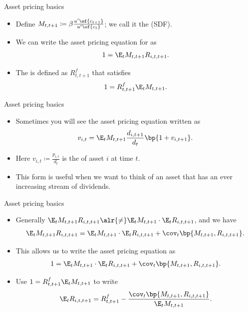 \documentclass[11pt,xcolor={dvipsnames},aspectratio=159,hyperref={pdftex,pdfpagemode=UseNone,hidelinks,pdfdisplaydoctitle=true},usepdftitle=false]{beamer}
\begin{document}
\begin{frame}{Asset pricing basics}  
    \begin{itemize}
        \item Define $M_{t,t+1}\coloneq \beta \frac{u^\prime\of{c_{t+1}}}{u^\prime\of{c_t}}$; we call it the  (SDF).
    \item We can write the asset pricing equation for  as \begin{align*}
    1 = \E_t M_{t,t+1} R_{i,t,t+1}.
\end{align*}
\item The  is defined as $R^f_{t,t+1}$ that satisfies \begin{align*} 
    1 = R^f_{t,t+1} \E_t M_{t,t+1}.
\end{align*}
        
\end{itemize}
\end{frame}


\begin{frame}{Asset pricing basics}  
    \begin{itemize}
        \item Sometimes you will see the asset pricing equation written as
        \begin{align*}
            v_{i,t} = \E_t M_{t,t+1} \frac{d_{i,t+1}}{d_t} \bp{1+v_{i,t+1}}.
        \end{align*}
        \item Here $v_{i,t}\coloneq \frac{p_{i,t}}{d_t}$ is the  of asset $i$ at time $t$.
        \item This form is useful when we want to think of an asset that has an ever increasing stream of dividends.
\end{itemize}
\end{frame}

\begin{frame}{Asset pricing basics}  
    \begin{itemize}
        \item Generally $\E_t M_{t,t+1} R_{i,t,t+1} \alr{\neq} \E_t M_{t,t+1} \cdot \E_t R_{i,t,t+1}$, and we have 
        \begin{align*}
            \E_t M_{t,t+1} R_{i,t,t+1} = \E_t M_{t,t+1} \cdot \E_t R_{i,t,t+1} + \cov_t \bp{M_{t,t+1}, R_{i,t,t+1}}.
        \end{align*}
        \item This allows us to write the asset pricing equation as
        \begin{align*}
            1 = \E_t M_{t,t+1} \cdot \E_t R_{i,t,t+1} + \cov_t \bp{M_{t,t+1}, R_{i,t,t+1}}. 
        \end{align*}
        \item Use $1 = R^f_{t,t+1} \E_t M_{t,t+1}$ to write 
        \begin{align*}
            \E_t R_{i,t,t+1} = R^f_{t,t+1} - \frac{\cov_t \bp{M_{t,t+1}, R_{i,t,t+1}}}{\E_t M_{t,t+1}}.
        \end{align*}
\end{itemize}
\end{frame}
\end{document}
